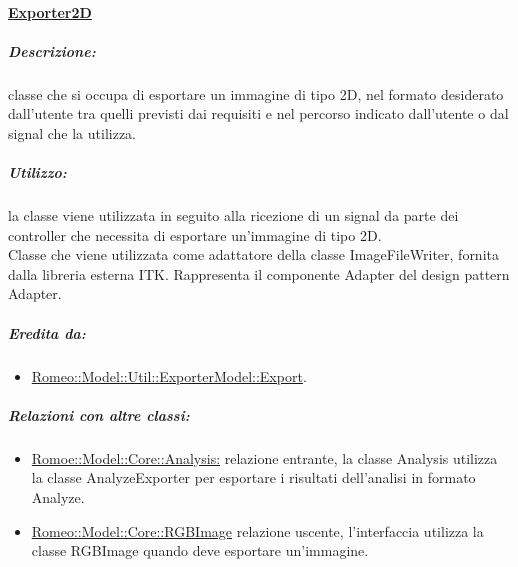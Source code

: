 		\paragraph{\underline{Exporter2D}}
				\label{expo_analyze}
				 	\subparagraph{Descrizione:} classe che si occupa di esportare un immagine di tipo 2D, nel formato desiderato dall'utente tra quelli previsti dai requisiti e nel percorso indicato dall'utente o dal signal\glossario{} che la utilizza.
				\subparagraph{Utilizzo:} la classe viene utilizzata in seguito alla ricezione di un signal\glossario{} da parte dei controller che necessita di esportare un'immagine di tipo 2D. 
				\\Classe che viene utilizzata come adattatore della classe ImageFileWriter, fornita dalla libreria esterna ITK\g{}. Rappresenta il componente Adapter del design pattern\g{} Adapter.
				 	\subparagraph{Eredita da:}
							\begin{itemize}
								\item \hyperref[expo]{Romeo::Model::Util::ExporterModel::Export}.				
							\end{itemize}
					\subparagraph{Relazioni con altre classi:}
						\begin{itemize}
							\item \hyperref[]{Romoe::Model::Core::Analysis:} relazione entrante, la classe Analysis utilizza la classe AnalyzeExporter per esportare i risultati dell'analisi in formato Analyze\g{}.
							\item \hyperref[]{Romeo::Model::Core::RGBImage} relazione uscente, l'interfaccia utilizza la classe RGBImage quando deve esportare un'immagine.
						\end{itemize}

